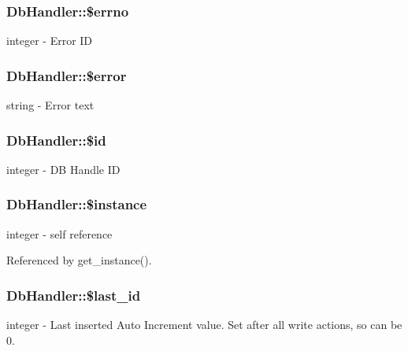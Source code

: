 \subsubsection[{\$errno}]{\setlength{\rightskip}{0pt plus 5cm}DbHandler::\$errno}\label{classDbHandler_af6e9f493be56617cb533763bb2a0e85a}
integer -\/ Error ID 
\subsubsection[{\$error}]{\setlength{\rightskip}{0pt plus 5cm}DbHandler::\$error}\label{classDbHandler_ade79e11156abbfc180864beb5b9df377}
string -\/ Error text 
\subsubsection[{\$id}]{\setlength{\rightskip}{0pt plus 5cm}DbHandler::\$id}\label{classDbHandler_ad38e1c3312815c8ad4093957881092ff}
integer -\/ DB Handle ID 
\subsubsection[{\$instance}]{\setlength{\rightskip}{0pt plus 5cm}DbHandler::\$instance}\label{classDbHandler_a0859a862eac3e8ba14c6d04de0396710}
integer -\/ self reference 

Referenced by get\_\-instance().

\subsubsection[{\$last\_\-id}]{\setlength{\rightskip}{0pt plus 5cm}DbHandler::\$last\_\-id}\label{classDbHandler_aaa5ed1e6f29e1faa49c503ba9b3134ac}
integer -\/ Last inserted Auto Increment value. Set after all write actions, so can be 0. 
